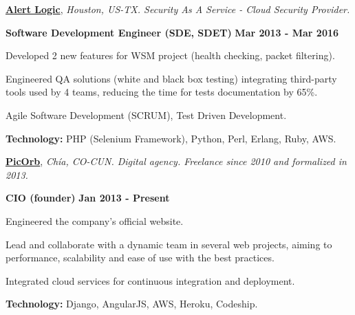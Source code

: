 \href{http://alertlogic.com/}{\textbf{Alert Logic}}, \textit{Houston, US-TX.
Security As A Service - Cloud Security Provider.}

\begin{outerlist}
\item[\FA \faAngleDoubleRight] \textbf{Software Development Engineer (SDE,
SDET)}
\hfill
\textbf{Mar 2013 - Mar 2016}
\end{outerlist}

    \begin{innerlist}
\item Developed 2 new features for WSM project (health checking, packet
filtering).
\item Engineered QA solutions (white and black box testing) integrating
third-party tools used by 4 teams, reducing the time for tests
documentation by 65\%.
\item Agile Software Development (SCRUM), Test Driven Development.
\item \textbf{Technology:} PHP (Selenium Framework), Python, Perl, Erlang, Ruby,
AWS.
    \end{innerlist}

\quarterblankline

\href{http://www.picorb.com/}{\textbf{PicOrb}}, \textit{Ch\'ia, CO-CUN.
Digital agency. Freelance since 2010 and formalized in
2013.}

\begin{outerlist}
\item[\FA \faAngleDoubleRight] \textbf{CIO (founder)} \hfill \textbf{Jan 2013 -
Present}
\end{outerlist}

    \begin{innerlist}
\item Engineered the company's official website.
\item Lead and collaborate with a dynamic team in several
web projects, aiming to performance, scalability and ease of use with
the best practices.
\item Integrated cloud services for continuous integration and
deployment.
\item \textbf{Technology:} Django, AngularJS, AWS, Heroku, Codeship.
    \end{innerlist}


